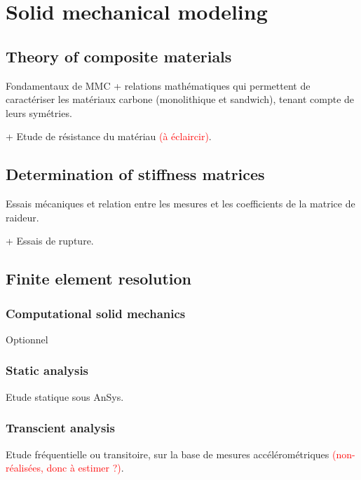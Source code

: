 \documentclass{article}
\begin{document}
\tableofcontents
\newpage

\setcounter{page}{1}

\section{Solid mechanical modeling}

\subsection{Theory of composite materials}

Fondamentaux de MMC + relations mathématiques qui permettent de caractériser les matériaux carbone (monolithique et sandwich), tenant compte de leurs symétries.

+ Etude de résistance du matériau \textcolor{red}{(à éclaircir)}.

\subsection{Determination of stiffness matrices}

Essais mécaniques et relation entre les mesures et les coefficients de la matrice de raideur.

+ Essais de rupture.

\subsection{Finite element resolution}

\subsubsection{Computational solid mechanics}

Optionnel

\subsubsection{Static analysis}

Etude statique sous AnSys.

\subsubsection{Transcient analysis}

Etude fréquentielle ou transitoire, sur la base de mesures accélérométriques \textcolor{red}{(non-réalisées, donc à estimer ?)}.
\end{document}
